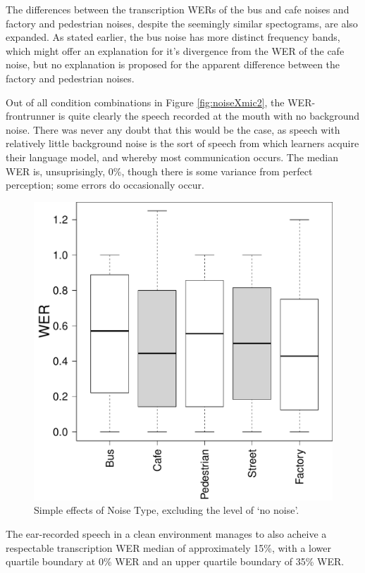 \documentclass[dissertation,copyright]{uathesis}
\makeatletter
\def\maxwidth{ %
  \ifdim\Gin@nat@width>\linewidth
    \linewidth
  \else
    \Gin@nat@width
  \fi
}
\makeatother
\begin{document}
The differences between the transcription WERs of the bus and cafe noises and factory and pedestrian noises, despite the seemingly similar spectograms, are also expanded.  As stated earlier, the bus noise has more distinct frequency bands, which might offer an explanation for it's divergence from the WER of the cafe noise, but no explanation is proposed for the apparent difference between the factory and pedestrian noises.

Out of all condition combinations in Figure \ref{fig:noiseXmic2}, the WER-frontrunner is quite clearly the speech recorded at the mouth with no background noise.  There was never any doubt that this would be the case, as speech with relatively little background noise is the sort of speech from which learners acquire their language model, and whereby most communication occurs.  The median WER is, unsuprisingly, 0\%, though there is some variance from perfect perception; some errors do occasionally occur. 
%
\begin{figure}

\includegraphics[width=\maxwidth]{figure/Noise-type_simple-1} 

\caption{Simple effects of Noise Type, excluding the level of `no noise'.}
\label{fig:noise-type_non-no-noise_main}
\end{figure}
%
The ear-recorded speech in a clean environment manages to also acheive a respectable transcription WER median of approximately 15\%, with a lower quartile boundary at 0\% WER and an upper quartile boundary of 35\% WER.
\end{document}
